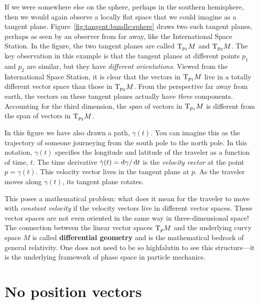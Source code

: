 \documentclass[12pt, oneside]{report}    %
\let\oldsection\section
\def\section{%
  \setcounter{sidenote}{1}%
  \oldsection
}
\begin{document}
If we were somewhere else on the sphere, perhaps in the southern hemisphere, then we would again observe a locally flat space that we could imagine as a tangent plane. Figure~\ref{fig:tangent:bundle:sphere} draws two such tangent planes, perhaps as seen by an observer from far away, like the International Space Station. In the figure, the two tangent planes are called $\textnormal{T}_{p_1}M$ and $\textnormal{T}_{p_2}M$. The key observation in this example is that the tangent planes at different points $p_1$ and $p_2$ are similar, but they have \emph{different orientations}. Viewed from the International Space Station, it is clear that the vectors in $\textnormal{T}_{p_1}M$ live in a totally different vector space than those in $\textnormal{T}_{p_2}M$. From the perspective far away from earth, the vectors on these tangent planes actually have \emph{three} components. Accounting for the third dimension, the \emph{span} of vectors in $\textnormal{T}_{p_1}M$ is different from the span of vectors in $\textnormal{T}_{p_2}M$.


In this figure we have also drawn a path, $\gamma(t)$. You can imagine this as the trajectory of someone journeying from the south pole to the north pole. In this notation, $\gamma(t)$ specifies the longitude and latitude of the traveler as a function of time, $t$. The time derivative $\dot\gamma(t)=\operatorname{d}\!{\gamma}/\operatorname{d}\!{t}$ is the \emph{velocity vector} at the point $p=\gamma(t)$. This velocity vector lives in the tangent plane at $p$. As the traveler moves along $\gamma(t)$, its tangent plane rotates. 

This poses a mathematical problem: what does it mean for the traveler to move with \emph{constant velocity} if the velocity vectors live in different vector spaces. These vector spaces are not even oriented in the same way in three-dimensional space! The connection between the linear vector spaces $\textnormal{T}_pM$ and the underlying curvy space $M$ is called \textbf{differential geometry} and is the mathematical bedrock of general relativity. One does not need to be so highfalutin to see this structure---it is the underlying framework of phase space in particle mechanics. 



\section{No position vectors}
\end{document}
